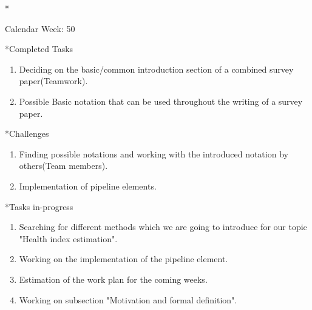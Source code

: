 \documentclass[11pt,a4paper]{article}
\begin{document}
\newpage
\begin{section}*{Calendar Week: 50 \hfill \date{11 December, 2020}}

\begin{subsection}*{Completed Tasks}
    \begin{enumerate}
        \item
            Deciding on the basic/common introduction section of a combined survey paper(Teamwork).
        \item
            Possible Basic notation that can be used throughout the writing of a survey paper.
    \end{enumerate}
\end{subsection}

\begin{subsection}*{Challenges}
    \begin{enumerate}
        \item
            Finding possible notations and working with the introduced notation by others(Team members).
        \item
            Implementation of pipeline elements.
    \end{enumerate}
\end{subsection}

\begin{subsection}*{Tasks in-progress}
    \begin{enumerate}
        \item
            Searching for different methods which we are going to introduce for our topic "Health index estimation".
        \item
            Working on the implementation of the pipeline element.
        \item
            Estimation of the work plan for the coming weeks.
        \item
            Working on subsection "Motivation and formal definition".
    \end{enumerate}
\end{subsection}

\end{section}
\end{document}
